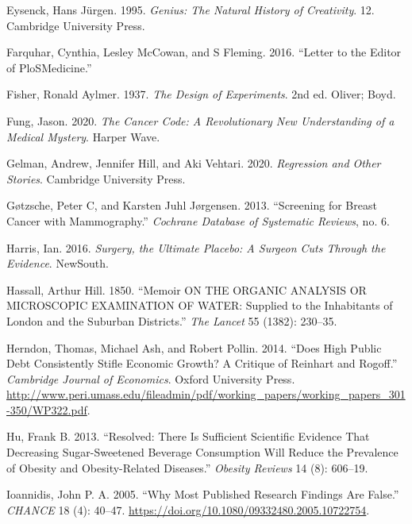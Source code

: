 \documentclass[
  10pt,
  b5paper]{book}
\newlength{\cslhangindent}
\newlength{\cslentryspacingunit} %
\newenvironment{CSLReferences}[2] %
 {%
  \setlength{\parindent}{0pt}
  \ifodd #1
  \let\oldpar\par
  \def\par{\hangindent=\cslhangindent\oldpar}
  \fi
  \setlength{\parskip}{#2\cslentryspacingunit}
 }%
 {}
\begin{document}
\begin{CSLReferences}{1}{0}
\leavevmode{}%
Eysenck, Hans Jürgen. 1995. \emph{Genius: The Natural History of Creativity}. 12. Cambridge University Press.

\leavevmode{}%
Farquhar, Cynthia, Lesley McCowan, and S Fleming. 2016. {``Letter to the Editor of PloSMedicine.''}

\leavevmode{}%
Fisher, Ronald Aylmer. 1937. \emph{The Design of Experiments}. 2nd ed. Oliver; Boyd.

\leavevmode{}%
Fung, Jason. 2020. \emph{The Cancer Code: A Revolutionary New Understanding of a Medical Mystery}. Harper Wave.

\leavevmode{}%
Gelman, Andrew, Jennifer Hill, and Aki Vehtari. 2020. \emph{Regression and Other Stories}. Cambridge University Press.

\leavevmode{}%
Gøtzsche, Peter C, and Karsten Juhl Jørgensen. 2013. {``Screening for Breast Cancer with Mammography.''} \emph{Cochrane Database of Systematic Reviews}, no. 6.

\leavevmode{}%
Harris, Ian. 2016. \emph{Surgery, the Ultimate Placebo: A Surgeon Cuts Through the Evidence}. NewSouth.

\leavevmode{}%
Hassall, Arthur Hill. 1850. {``Memoir ON THE ORGANIC ANALYSIS OR MICROSCOPIC EXAMINATION OF WATER: Supplied to the Inhabitants of London and the Suburban Districts.''} \emph{The Lancet} 55 (1382): 230--35.

\leavevmode{}%
Herndon, Thomas, Michael Ash, and Robert Pollin. 2014. {``Does High Public Debt Consistently Stifle Economic Growth? A Critique of Reinhart and Rogoff.''} \emph{Cambridge Journal of Economics}. Oxford University Press. \url{http://www.peri.umass.edu/fileadmin/pdf/working_papers/working_papers_301-350/WP322.pdf}.

\leavevmode{}%
Hu, Frank B. 2013. {``Resolved: There Is Sufficient Scientific Evidence That Decreasing Sugar-Sweetened Beverage Consumption Will Reduce the Prevalence of Obesity and Obesity-Related Diseases.''} \emph{Obesity Reviews} 14 (8): 606--19.

\leavevmode{}%
Ioannidis, John P. A. 2005. {``Why Most Published Research Findings Are False.''} \emph{CHANCE} 18 (4): 40--47. \url{https://doi.org/10.1080/09332480.2005.10722754}.


\end{CSLReferences}
\end{document}
